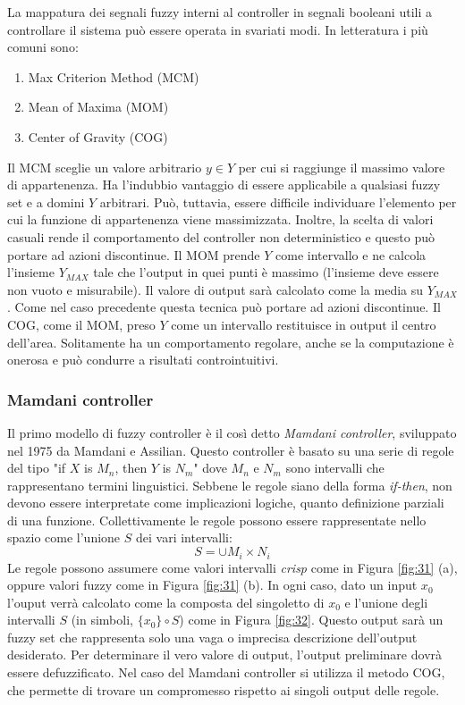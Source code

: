\documentclass[10pt,a4paper]{article}
\begin{document}
La mappatura dei segnali fuzzy interni al controller in segnali booleani utili a controllare il sistema può essere operata in svariati modi. In letteratura i più comuni sono:

\begin{enumerate}
\item{Max Criterion Method (MCM)}
\item{Mean of Maxima (MOM)}
\item{Center of Gravity (COG)}
\end{enumerate}

Il MCM sceglie un valore arbitrario $y \in Y$ per cui si raggiunge il massimo valore di appartenenza. Ha l'indubbio vantaggio di essere applicabile a qualsiasi fuzzy set e a domini $Y$ arbitrari. Può, tuttavia, essere difficile individuare l'elemento per cui la funzione di appartenenza viene massimizzata. Inoltre, la scelta di valori casuali rende il comportamento del controller non deterministico e questo può portare ad azioni discontinue.
Il MOM  prende $Y$ come intervallo e ne calcola l'insieme $Y_{MAX}$ tale che l'output in quei punti è massimo (l'insieme deve essere non vuoto e misurabile). Il valore di output sarà calcolato come la media su $Y_{MAX}$. Come nel caso precedente questa tecnica può portare ad azioni discontinue. 
Il COG, come il MOM, preso $Y$ come un intervallo restituisce in output il centro dell'area. Solitamente ha un comportamento regolare, anche se la computazione è onerosa e può condurre a risultati controintuitivi. 


\subsubsection{Mamdani controller}

Il primo modello di fuzzy controller è il così detto \emph{Mamdani controller}, sviluppato nel 1975 da Mamdani e Assilian. Questo controller è basato su una serie di regole del tipo "if $X$ is $M_n$, then $Y$ is $N_m$" dove $M_n$ e $N_m$ sono intervalli che rappresentano termini linguistici. Sebbene le regole siano della forma \emph{if-then}, non devono essere interpretate come implicazioni logiche, quanto definizione parziali di una funzione. Collettivamente le regole possono essere rappresentate nello spazio come l'unione $S$ dei vari intervalli:
$$
S = \cup M_i \times N_i
$$
Le regole possono assumere come valori intervalli \emph{crisp} come in Figura \ref{fig:31} (a), oppure valori fuzzy come in Figura \ref{fig:31} (b). In ogni caso, dato un input $x_0$ l'ouput verrà calcolato come la composta del singoletto di $x_0$ e l'unione degli intervalli $S$ (in simboli, $\{x_0\} \circ S$) come in Figura \ref{fig:32}. Questo output sarà un fuzzy set che rappresenta solo una vaga o imprecisa descrizione dell'output desiderato. Per determinare il vero valore di output, l'output preliminare dovrà essere defuzzificato. Nel caso del Mamdani controller si utilizza il metodo COG, che permette di trovare un compromesso rispetto ai singoli output delle regole.
 
\end{document}
